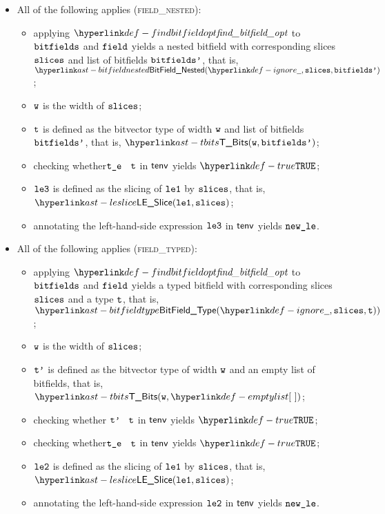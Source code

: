 \begin{itemize}
\begin{itemize}
    \item All of the following applies (\textsc{field\_nested}):
    \begin{itemize}
      \item applying $\findbitfieldopt$ to $\texttt{bitfields}$ and $\texttt{field}$ yields a nested bitfield with corresponding
            slices $\texttt{slices}$ and list of bitfields $\texttt{bitfields'}$, that is, \\ $\BitFieldNested(\Ignore, \slices, \bitfieldsp)$;
      \item $\texttt{w}$ is the width of $\texttt{slices}$;
      \item $\texttt{t}$ is defined as the bitvector type of width $\texttt{w}$ and list of bitfields $\texttt{bitfields'}$, that is, $\TBits(\vw, \bitfieldsp)$;
      \item checking whether$\texttt{t\_e}$ \typesatisfies\ $\texttt{t}$ in $\textsf{tenv}$ yields $\True$\ProseOrTypeError;
      \item $\texttt{le3}$ is defined as the slicing of $\texttt{le1}$ by $\texttt{slices}$, that is, \\ $\LESlice(\vleone, \slices)$;
      \item annotating the left-hand-side expression $\texttt{le3}$ in $\textsf{tenv}$ yields $\texttt{new\_le}$\ProseOrTypeError.
    \end{itemize}

    \item All of the following applies (\textsc{field\_typed}):
    \begin{itemize}
      \item applying $\findbitfieldopt$ to $\texttt{bitfields}$ and $\texttt{field}$ yields a typed bitfield with corresponding
            slices $\texttt{slices}$ and a type $\texttt{t}$, that is, \\ $\BitFieldType(\Ignore, \vslices, \vt))$;
      \item $\texttt{w}$ is the width of $\texttt{slices}$;
      \item $\texttt{t'}$ is defined as the bitvector type of width $\texttt{w}$ and an empty list of bitfields, that is, $\TBits(\vw , \emptylist)$;
      \item checking whether $\texttt{t'}$ \typesatisfies\ $\texttt{t}$ in $\textsf{tenv}$ yields $\True$\ProseOrTypeError;
      \item checking whether$\texttt{t\_e}$ \typesatisfies\ $\texttt{t}$ in $\textsf{tenv}$ yields $\True$\ProseOrTypeError;
      \item $\texttt{le2}$ is defined as the slicing of $\texttt{le1}$ by $\texttt{slices}$, that is, \\ $\LESlice(\vleone, \slices)$;
      \item annotating the left-hand-side expression $\texttt{le2}$ in $\textsf{tenv}$ yields $\texttt{new\_le}$\ProseOrTypeError.
    \end{itemize}
  \end{itemize}
\end{itemize}

